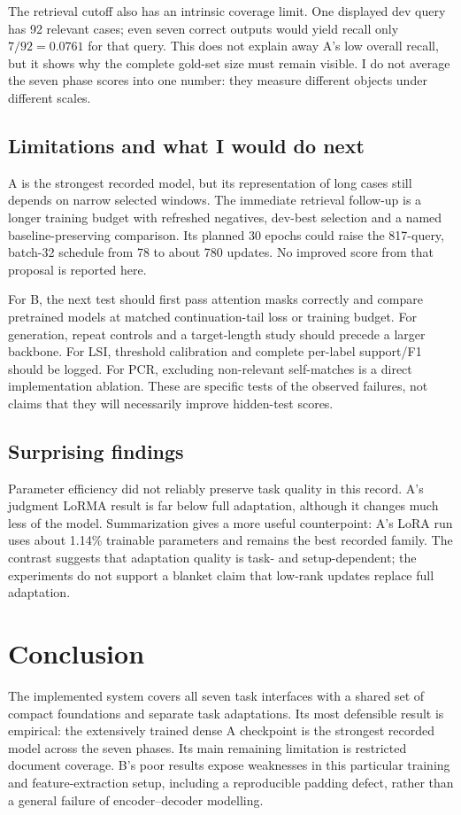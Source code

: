 \documentclass[11pt, oneside]{article}
\begin{document}
The retrieval cutoff also has an intrinsic coverage limit. One displayed dev query has 92 relevant cases;
even seven correct outputs would yield recall only $7/92=0.0761$ for that query. This does not explain
away A's low overall recall, but it shows why the complete gold-set size must remain visible. I do not
average the seven phase scores into one number: they measure different objects under different scales.

\subsection{Limitations and what I would do next}
A is the strongest recorded model, but its representation of long cases still depends on narrow
selected windows. The immediate retrieval follow-up is a longer training budget with refreshed negatives, dev-best selection and a named
baseline-preserving comparison. Its planned 30 epochs could raise the 817-query, batch-32 schedule from
78 to about 780 updates. No improved score from that proposal is reported here.

For B, the next test should first pass attention masks correctly and compare pretrained models at matched
continuation-tail loss or training budget. For generation, repeat controls and a target-length study should
precede a larger backbone. For LSI, threshold calibration and complete per-label support/F1 should be
logged. For PCR, excluding non-relevant self-matches is a direct implementation ablation. These are
specific tests of the observed failures, not claims that they will necessarily improve hidden-test scores.

\subsection{Surprising findings}
Parameter efficiency did not reliably preserve task quality in this record. A's judgment LoRMA result is
far below full adaptation, although it changes much less of the model. Summarization gives a more useful
counterpoint: A's LoRA run uses about 1.14\% trainable parameters and remains the best recorded family.
The contrast suggests that adaptation quality is task- and setup-dependent; the experiments do not
support a blanket claim that low-rank updates replace full adaptation.

\section{Conclusion}
The implemented system covers all seven task interfaces with a shared set of compact foundations and
separate task adaptations. Its most defensible result is empirical: the extensively trained dense A
checkpoint is the strongest recorded model across the seven phases. Its main remaining limitation is restricted document coverage. B's poor results expose weaknesses in this
particular training and feature-extraction setup, including a reproducible padding defect, rather than a
general failure of encoder--decoder modelling.
\end{document}
